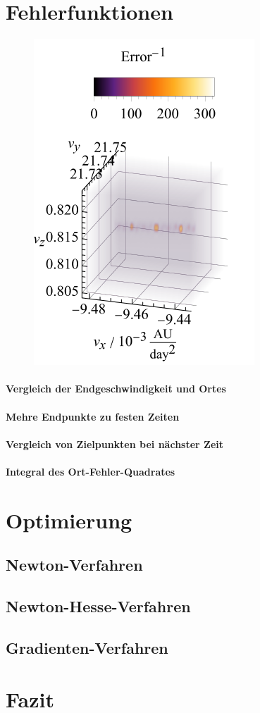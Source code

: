 \section{Fehlerfunktionen}
\begin{figure}[h!]
	\centering
	\includegraphics[scale=1.38888]{img/gridSearch.pdf}
\end{figure}


\paragraph{Vergleich der Endgeschwindigkeit und Ortes}
\paragraph{Mehre Endpunkte zu festen Zeiten}
\paragraph{Vergleich von Zielpunkten bei nächster Zeit}
\paragraph{Integral des Ort-Fehler-Quadrates}

\section{Optimierung}
\subsection{Newton-Verfahren}
\subsection{Newton-Hesse-Verfahren}
\subsection{Gradienten-Verfahren}

\section{Fazit}




